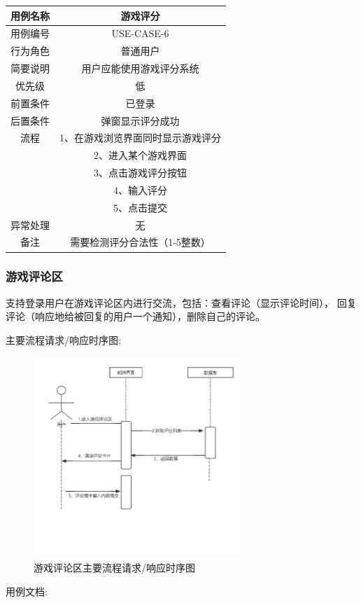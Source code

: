 \documentclass[12pt]{ctexart} %
\begin{document}
\begin{tabular}{|c|c|}
  \hline
  用例名称& 游戏评分\\
  \hline
  用例编号 & USE-CASE-6\\
  \hline
  行为角色 & 普通用户\\
  \hline
  简要说明 & 用户应能使用游戏评分系统\\
  \hline
  优先级 & 低\\
  \hline
  前置条件 & 已登录\\
  \hline
  后置条件 & 弹窗显示评分成功\\
  \hline
  流程 & 1、在游戏浏览界面同时显示游戏评分\\
      & 2、进入某个游戏界面\\
      &  3、点击游戏评分按钮\\
      &  4、输入评分\\
      &  5、点击提交\\
  \hline
  异常处理 & 无\\
  \hline
  备注 & 需要检测评分合法性（1-5整数）\\
  \hline
\end{tabular}

\subsubsection{游戏评论区}
支持登录用户在游戏评论区内进行交流，包括：查看评论（显示评论时间），
回复评论（响应地给被回复的用户一个通知），删除自己的评论。

主要流程请求/响应时序图:
\begin{figure}[ht]
  \centering
  \includegraphics[width=0.7\textwidth]{yongli7.jpg}
  \caption{游戏评论区主要流程请求/响应时序图}
\end{figure}
用例文档:
\end{document}
